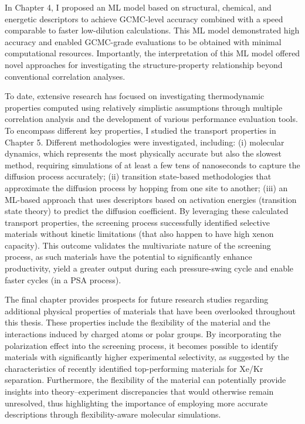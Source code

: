In Chapter 4, I proposed an ML model based on structural, chemical, and energetic descriptors to achieve GCMC-level accuracy combined with a speed comparable to faster low-dilution calculations.\autocite{Ren_2023_ml} This ML model demonstrated high accuracy and enabled GCMC-grade evaluations to be obtained with minimal computational resources. Importantly, the interpretation of this ML model offered novel approaches for investigating the structure-property relationship beyond conventional correlation analyses.

To date, extensive research has focused on investigating thermodynamic properties computed using relatively simplistic assumptions through multiple correlation analysis and the development of various performance evaluation tools. To encompass different key properties, I studied the transport properties in Chapter 5. Different methodologies were investigated, including: (i) molecular dynamics, which represents the most physically accurate but also the slowest method, requiring simulations of at least a few tens of nanoseconds to capture the diffusion process accurately; (ii) transition state-based methodologies that approximate the diffusion process by hopping from one site to another; (iii) an ML-based approach that uses descriptors based on activation energies (transition state theory) to predict the diffusion coefficient. By leveraging these calculated transport properties, the screening process successfully identified selective materials without kinetic limitations (that also happen to have high xenon capacity). This outcome validates the multivariate nature of the screening process, as such materials have the potential to significantly enhance productivity, yield a greater output during each pressure-swing cycle and enable faster cycles (in a PSA process). 

The final chapter provides prospects for future research studies regarding additional physical properties of materials that have been overlooked throughout this thesis. These properties include the flexibility of the material and the interactions induced by charged atoms or polar groups. By incorporating the polarization effect into the screening process, it becomes possible to identify materials with significantly higher experimental selectivity, as suggested by the characteristics of recently identified top-performing materials for Xe/Kr separation.\autocite{Li_2019,Pei_2022} Furthermore, the flexibility of the material can potentially provide insights into theory--experiment discrepancies that would otherwise remain unresolved, thus highlighting the importance of employing more accurate descriptions through flexibility-aware molecular simulations.

